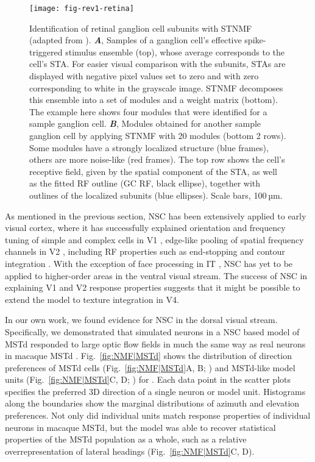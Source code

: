 \begin{figure}[ht]
	\centering
	\texttt{[image: fig-rev1-retina]}
    \caption{
    Identification of retinal ganglion cell subunits 
    with \ac{STNMF} (adapted  from \cite{Liu2017}).
    \textbf{\emph{A}},
	     Samples of a ganglion cell’s effective spike-triggered stimulus ensemble (top),
         whose average corresponds to the cell’s \ac{STA}.
         For easier visual comparison with the subunits,
         \acp{STA} are displayed with negative pixel values set to zero and
         with zero corresponding to white in the grayscale image.
         \ac{STNMF} decomposes this ensemble into a set of modules and 
         a weight matrix (bottom).
         The example here shows four modules that were identified for
         a sample ganglion cell.
    \textbf{\emph{B}},
         Modules obtained for another sample ganglion cell by applying \ac{STNMF}
         with 20 modules (bottom 2 rows). Some modules have a strongly localized structure 
         (blue frames), others are more noise-like (red frames).
         The top row shows the cell’s receptive field,
         given by the spatial component of the STA, as well as the fitted \ac{RF} outline
         (GC RF, black ellipse), together with outlines of the localized subunits 
         (blue ellipses). Scale bars, 100 µm.
    }
	\label{fig:NMF|retina}
\end{figure}

As mentioned in the previous section,
\ac{NSC} has been extensively applied to early visual cortex,
where it has successfully explained 
orientation and frequency tuning of simple and complex cells in \ac{V1} \cite{Hoyer2003},
edge-like pooling of spatial frequency channels in V2 \cite{Hyvarinen2005},
including \ac{RF} properties such as end-stopping and contour integration 
\cite{HoyerHyvarinen2002}.
With the exception of face processing in \ac{IT}
\cite{LeeSeung1999,ChangTsao2017},
\ac{NSC} has yet to be applied to higher-order areas in the ventral visual stream.
The success of \ac{NSC} in explaining V1 and V2 response properties
suggests that it might be possible to extend the model to texture integration in
V4.

In our own work, we found evidence for \ac{NSC} in the dorsal visual stream.
Specifically, we demonstrated that simulated neurons 
in a \ac{NSC} based model of \ac{MSTd} 
responded to  large optic flow fields in much the same way as real neurons in macaque \ac{MSTd} \cite{Beyeler2016}.
Fig.~\ref{fig:NMF|MSTd} shows the distribution of direction preferences
of \ac{MSTd} cells (Fig.~\ref{fig:NMF|MSTd}A, B; \cite{Takahashi2007})
and \ac{MSTd}-like model units (Fig.~\ref{fig:NMF|MSTd}C, D; \cite{Beyeler2016})
for .
Each data point in the scatter plots specifies the preferred 3D direction
of a single neuron or model unit.
Histograms along the boundaries show the marginal distributions of azimuth
and elevation preferences.
Not only did individual units match response properties of individual neurons
in macaque \ac{MSTd},
but the model was able to recover statistical properties of the \ac{MSTd}
population as a whole, such as a relative overrepresentation of lateral
headings (Fig.~\ref{fig:NMF|MSTd}C, D).

